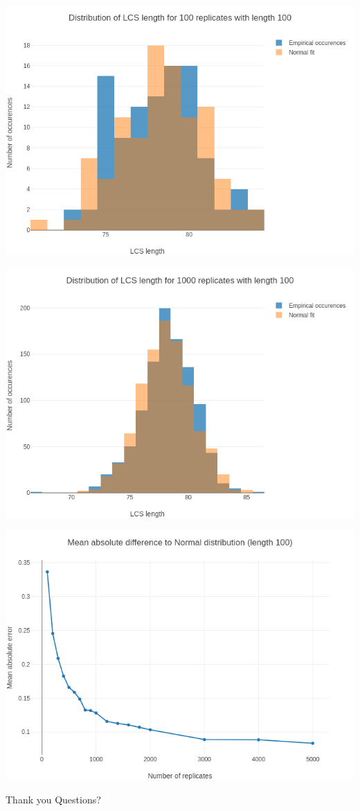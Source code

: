 \documentclass{beamer}
\begin{document}
\begin{frame}
  \includegraphics[width=\textwidth]{img/comparison_normal_rep100.png}
\end{frame}

\begin{frame}
  \includegraphics[width=\textwidth]{img/comparison_normal_rep1000.png}
\end{frame}

\begin{frame}
  \includegraphics[width=\textwidth]{img/diff_to_normal.png}
\end{frame}

\begin{frame}[standout]
  Thank you
  \vfill
  Questions?
  \vfill
\end{frame}
\end{document}
